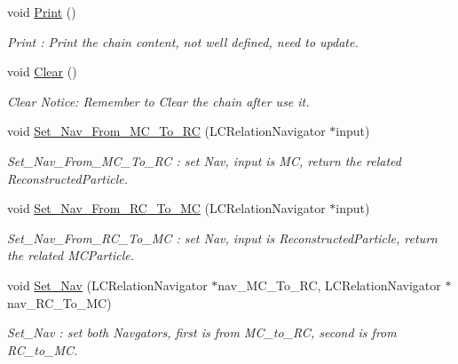 \begin{DoxyCompactItemize}
\item 
\hypertarget{classToolSet_1_1CChain__Vec_a67738820b5fe16dcd3b6ba834a7f3088}{
void \hyperlink{classToolSet_1_1CChain__Vec_a67738820b5fe16dcd3b6ba834a7f3088}{Print} ()}
\label{classToolSet_1_1CChain__Vec_a67738820b5fe16dcd3b6ba834a7f3088}

\begin{DoxyCompactList}\small\item\em Print : Print the chain content, not well defined, need to update. \item\end{DoxyCompactList}\item 
void \hyperlink{classToolSet_1_1CChain__Vec_a3068461a3bd0fe085f522e6bb2d24f07}{Clear} ()
\begin{DoxyCompactList}\small\item\em Clear Notice: Remember to Clear the chain after use it. \item\end{DoxyCompactList}\item 
void \hyperlink{classToolSet_1_1CChain__Vec_aa9b42030de1b1ceb6da2c01d139e74b6}{Set\_\-Nav\_\-From\_\-MC\_\-To\_\-RC} (LCRelationNavigator $\ast$input)
\begin{DoxyCompactList}\small\item\em Set\_\-Nav\_\-From\_\-MC\_\-To\_\-RC : set Nav, input is MC, return the related ReconstructedParticle. \item\end{DoxyCompactList}\item 
void \hyperlink{classToolSet_1_1CChain__Vec_afe1fa08d6a66df76ff6e2607f6832979}{Set\_\-Nav\_\-From\_\-RC\_\-To\_\-MC} (LCRelationNavigator $\ast$input)
\begin{DoxyCompactList}\small\item\em Set\_\-Nav\_\-From\_\-RC\_\-To\_\-MC : set Nav, input is ReconstructedParticle, return the related MCParticle. \item\end{DoxyCompactList}\item 
void \hyperlink{classToolSet_1_1CChain__Vec_ab62d10b8212ef4ad8eb6ba50e23fc9a0}{Set\_\-Nav} (LCRelationNavigator $\ast$nav\_\-MC\_\-To\_\-RC, LCRelationNavigator $\ast$nav\_\-RC\_\-To\_\-MC)
\begin{DoxyCompactList}\small\item\em Set\_\-Nav : set both Navgators, first is from MC\_\-to\_\-RC, second is from RC\_\-to\_\-MC. \item\end{DoxyCompactList}\item 

\end{DoxyCompactItemize}
